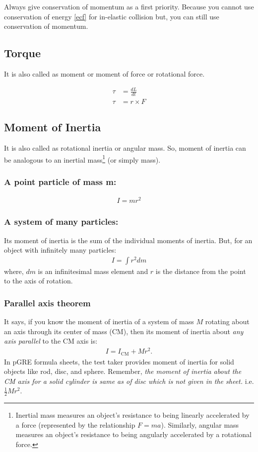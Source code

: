 \documentclass[12pt,a4paper]{article}
\begin{document}
Always give conservation of momentum as a first priority. Because you cannot use conservation of energy \ref{ecf} for in-elastic collision but, you can still use conservation of momentum. 

\subsection{Torque}

It is also called as moment or moment of force or rotational force.

\begin{align}
\tau &= \frac{dL}{dt} \nonumber \\
\tau &= r \times F 
\end{align}

\subsection{Moment of Inertia}
It is also called as rotational inertia or angular mass. So, moment of inertia can be analogous to an inertial mass\footnote{Inertial mass measures an object's resistance to being linearly accelerated by a force (represented by the relationship $F = ma$). Similarly, angular mass measures an object's resistance to being angularly accelerated by a rotational force.} (or simply mass).

\subsubsection*{A point particle of mass m:}
\begin{align*}
I = m r^{2}
\end{align*}
\subsubsection*{A system of many particles:}
Its moment of inertia is the sum of the individual moments of inertia. But, for an object with infinitely many particles:
\begin{align*}
I = \int r^{2} dm
\end{align*}
where, $dm$ is an infinitesimal mass element and $r$ is the distance from the point to the axis of rotation.

\subsubsection{Parallel axis theorem}
It says, if you know the moment of inertia of a system of mass $M$ rotating about an axis through its center of mass (CM), then its moment of inertia about \emph{any axis parallel} to the CM axis is:
\begin{align}
I = I_{\text{CM}} + M r^{2}.
\end{align}
In pGRE formula sheets, the test taker provides moment of inertia for solid objects like rod, disc, and sphere. Remember, \emph{the moment of inertia about the \emph{CM} axis for a solid cylinder is same as of disc which is not given in the sheet.} i.e. $\frac{1}{2}M r^{2}$.
\end{document}
